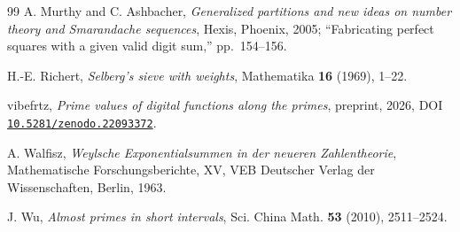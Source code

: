 \documentclass[11pt,reqno]{amsart}
\theoremstyle{plain}
\theoremstyle{definition}
\newcommand{\1}{\mathbf 1}
\begin{document}
\begin{thebibliography}{99}
 A. Murthy and C. Ashbacher, \emph{Generalized partitions and new ideas on number theory and Smarandache sequences}, Hexis, Phoenix, 2005; ``Fabricating perfect squares with a given valid digit sum,'' pp.~154--156.

 H.-E. Richert, \emph{Selberg's sieve with weights}, Mathematika \textbf{16} (1969), 1--22.

 vibefrtz, \emph{Prime values of digital functions along the primes}, preprint, 2026, DOI \href{https://doi.org/10.5281/zenodo.22093372}{\texttt{10.5281/zenodo.22093372}}.

 A. Walfisz, \emph{Weylsche Exponentialsummen in der neueren Zahlentheorie}, Mathematische Forschungsberichte, XV, VEB Deutscher Verlag der Wissenschaften, Berlin, 1963.

 J. Wu, \emph{Almost primes in short intervals}, Sci. China Math. \textbf{53} (2010), 2511--2524.

\end{thebibliography}
\end{document}
